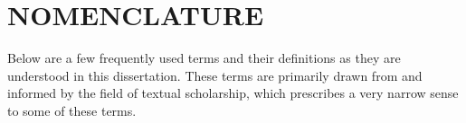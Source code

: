 %
%
%
%


\chapter*{NOMENCLATURE}


\indent Below are a few frequently used terms and their definitions as they are understood in this dissertation. These terms are primarily drawn from and informed by the field of textual scholarship, which prescribes a very narrow sense to some of these terms. 

